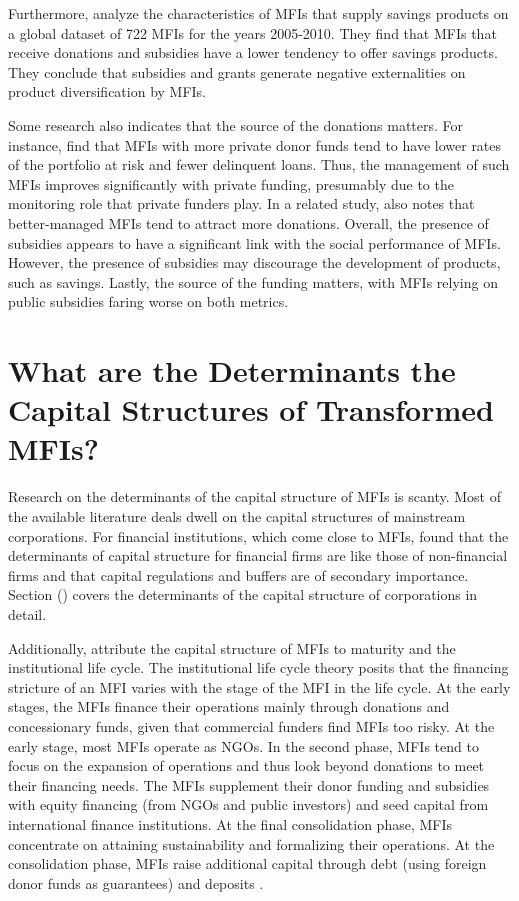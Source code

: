 \documentclass[a4paper,nobind]{templates/ociamthesis}
\begin{document}
Furthermore, \textcite{cozarenco2016type} analyze the characteristics of MFIs that supply savings products on a global dataset of 722 MFIs for the years 2005-2010. They find that MFIs that receive donations and subsidies have a lower tendency to offer savings products. They conclude that subsidies and grants generate negative externalities on product diversification by MFIs.

Some research also indicates that the source of the donations matters. For instance, \textcite{chakravarty2015role} find that MFIs with more private donor funds tend to have lower rates of the portfolio at risk and fewer delinquent loans. Thus, the management of such MFIs improves significantly with private funding, presumably due to the monitoring role that private funders play. In a related study, \textcite{hudon2010management} also notes that better-managed MFIs tend to attract more donations. Overall, the presence of subsidies appears to have a significant link with the social performance of MFIs. However, the presence of subsidies may discourage the development of products, such as savings. Lastly, the source of the funding matters, with MFIs relying on public subsidies faring worse on both metrics.

\hypertarget{what-are-the-determinants-the-capital-structures-of-transformed-mfis}{%
\section{What are the Determinants the Capital Structures of Transformed MFIs?}\label{what-are-the-determinants-the-capital-structures-of-transformed-mfis}}

Research on the determinants of the capital structure of MFIs is scanty. Most of the available literature deals dwell on the capital structures of mainstream corporations. For financial institutions, which come close to MFIs, \textcite{gropp2010determinants} found that the determinants of capital structure for financial firms are like those of non-financial firms and that capital regulations and buffers are of secondary importance. Section () covers the determinants of the capital structure of corporations in detail.

Additionally, \textcite{ledgerwood2006transforming} attribute the capital structure of MFIs to maturity and the institutional life cycle. The institutional life cycle theory posits that the financing stricture of an MFI varies with the stage of the MFI in the life cycle. At the early stages, the MFIs finance their operations mainly through donations and concessionary funds, given that commercial funders find MFIs too risky. At the early stage, most MFIs operate as NGOs. In the second phase, MFIs tend to focus on the expansion of operations and thus look beyond donations to meet their financing needs. The MFIs supplement their donor funding and subsidies with equity financing (from NGOs and public investors) and seed capital from international finance institutions. At the final consolidation phase, MFIs concentrate on attaining sustainability and formalizing their operations. At the consolidation phase, MFIs raise additional capital through debt (using foreign donor funds as guarantees) and deposits \textcite{bayai2016financing}.
\end{document}

